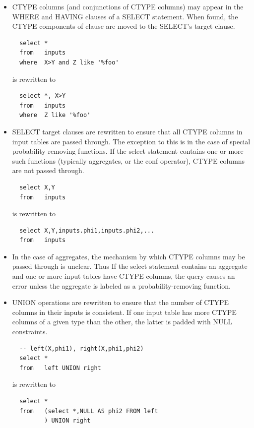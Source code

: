 \begin{itemize}
\item CTYPE columns (and conjunctions of CTYPE columns) may appear in the WHERE and HAVING clauses of a SELECT statement.  When found, the CTYPE components of clause are moved to the SELECT's target clause.
{\small\begin{verbatim}
  select *
  from   inputs
  where  X>Y and Z like '%foo'
\end{verbatim}}
is rewritten to
{\small\begin{verbatim}
  select *, X>Y
  from   inputs
  where  Z like '%foo'
\end{verbatim}}

\item SELECT target clauses are rewritten to ensure that all CTYPE columns in input tables are passed through.   The exception to this is in the case of special probability-removing functions.  If the select statement contains one or more such functions (typically aggregates, or the conf operator), CTYPE columns are not passed through.  
{\small\begin{verbatim}
  select X,Y
  from   inputs
\end{verbatim}}
is rewritten to
{\small\begin{verbatim}
  select X,Y,inputs.phi1,inputs.phi2,...
  from   inputs
\end{verbatim}}

\item In the case of aggregates, the mechanism by which CTYPE columns may be passed through is unclear.  Thus If the select statement contains an aggregate and one or more input tables have CTYPE columns, the query causes an error unless the aggregate is labeled as a probability-removing function.

\item UNION operations are rewritten to ensure that the number of CTYPE columns in their inputs is consistent.  If one input table has more CTYPE columns of a given type than the other, the latter is padded with NULL constraints.
{\small\begin{verbatim}
  -- left(X,phi1), right(X,phi1,phi2)
  select *
  from   left UNION right
\end{verbatim}}
is rewritten to
{\small\begin{verbatim}
  select *
  from   (select *,NULL AS phi2 FROM left
         ) UNION right
\end{verbatim}}

\end{itemize}

